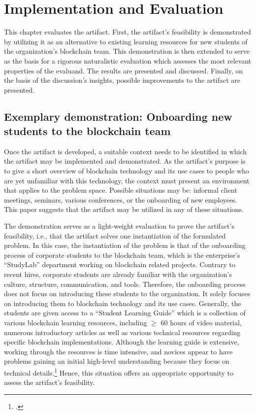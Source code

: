 \chapter{Implementation and Evaluation} \label{chap:Evaluation}

This chapter evaluates the artifact. First, the artifact's feasibility is demonstrated by utilizing it as an alternative to existing learning resources for new students of the organization's blockchain team. This demonstration is then extended to serve as the basis for a rigorous naturalistic evaluation which assesses the most relevant properties of the evaluand. The results are presented and discussed. Finally, on the basis of the discussion's insights, possible improvements to the artifact are presented.

\section{Exemplary demonstration: Onboarding new students to the blockchain team} \label{sec:demo}

Once the artifact is developed, a suitable context needs to be identified in which the artifact may be implemented and demonstrated. As the artifact's purpose is to give a short overview of blockchain technology and its use cases to people who are yet unfamiliar with this technology, the context must present an environment that applies to the problem space. Possible situations may be: informal client meetings, seminars, various conferences, or the onboarding of new employees. This paper suggests that the artifact may be utilized in any of these situations.

The demonstration serves as a light-weight evaluation to prove the artifact's feasibility, i.e., that the artifact solves one instantiation of the formulated problem. In this case, the instantiation of the problem is that of the onboarding process of corporate students to the blockchain team, which is the enterprise's \enquote{StudyLab} department working on blockchain related projects. Contrary to recent hires, corporate students are already familiar with the organization's culture, structure, communication, and tools. Therefore, the onboarding process does not focus on introducing these students to the organization. It solely focuses on introducing them to blockchain technology and its use cases. Generally, the students are given access to a \enquote{Student Learning Guide} which is a collection of various blockchain learning resources, including $\geq$ 60 hours of video material, numerous introductory articles as well as various technical resources regarding specific blockchain implementations. Although the learning guide is extensive, working through the resources is time intensive, and novices appear to have problems gaining an initial high-level understanding because they focus on technical details.\footcites[Cf.][]{RalphB_Interview} Hence, this situation offers an appropriate opportunity to assess the artifact's feasibility.

